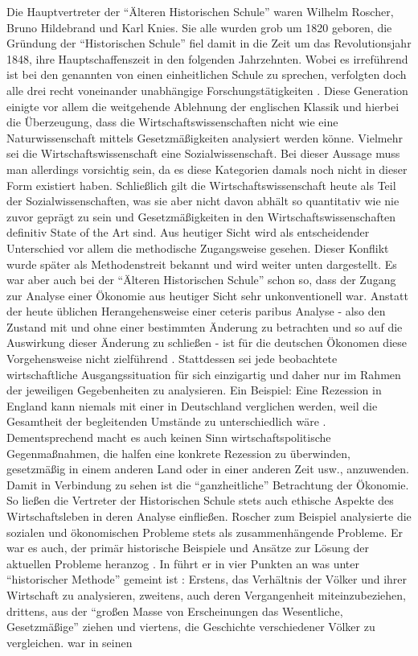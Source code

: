 Die Hauptvertreter der "`Älteren Historischen Schule"' waren Wilhelm Roscher, Bruno Hildebrand und Karl Knies. Sie alle wurden grob um 1820 geboren, die Gründung der "`Historischen Schule"' fiel damit in die Zeit um das Revolutionsjahr 1848, ihre Hauptschaffenszeit in den folgenden Jahrzehnten. Wobei es irreführend ist bei den genannten von einen einheitlichen Schule zu sprechen, verfolgten doch alle drei recht voneinander unabhängige Forschungstätigkeiten \parencite[S. 121]{Pierenkemper2012}. Diese Generation einigte vor allem die weitgehende Ablehnung der englischen Klassik und hierbei die Überzeugung, dass die Wirtschaftswissenschaften nicht wie eine Naturwissenschaft mittels Gesetzmäßigkeiten analysiert werden könne. Vielmehr sei die Wirtschaftswissenschaft eine Sozialwissenschaft. Bei dieser Aussage muss man allerdings vorsichtig sein, da es diese Kategorien damals noch nicht in dieser Form existiert haben. Schließlich gilt die Wirtschaftswissenschaft heute als Teil der Sozialwissenschaften, was sie aber nicht davon abhält so quantitativ wie nie zuvor geprägt zu sein und Gesetzmäßigkeiten in den Wirtschaftswissenschaften definitiv State of the Art sind. Aus heutiger Sicht wird als entscheidender Unterschied vor allem die methodische Zugangsweise gesehen. Dieser Konflikt wurde später als Methodenstreit bekannt und wird weiter unten dargestellt. Es war aber auch bei der "`Älteren Historischen Schule"' schon so, dass der Zugang zur Analyse einer Ökonomie aus heutiger Sicht sehr unkonventionell war. Anstatt der heute üblichen Herangehensweise einer ceteris paribus Analyse - also den Zustand mit und ohne einer bestimmten Änderung zu betrachten und so auf die Auswirkung dieser Änderung zu schließen - ist für die deutschen Ökonomen diese Vorgehensweise nicht zielführend \parencite[S. 236]{Rosner2012}. Stattdessen sei jede beobachtete wirtschaftliche Ausgangssituation für sich einzigartig und daher nur im Rahmen der jeweiligen Gegebenheiten zu analysieren. Ein Beispiel: Eine Rezession in England kann niemals mit einer in Deutschland verglichen werden, weil die Gesamtheit der begleitenden Umstände zu unterschiedlich wäre \parencite[S. 32]{Balabkins1993}. Dementsprechend macht es auch keinen Sinn wirtschaftspolitische Gegenmaßnahmen, die halfen eine konkrete Rezession zu überwinden, gesetzmäßig in einem anderen Land oder in einer anderen Zeit usw., anzuwenden. Damit in Verbindung zu sehen ist die "`ganzheitliche"' Betrachtung der Ökonomie. So ließen die Vertreter der Historischen Schule stets auch ethische Aspekte des Wirtschaftsleben in deren Analyse einfließen. Roscher zum Beispiel analysierte die sozialen und ökonomischen Probleme stets als zusammenhängende Probleme. Er war es auch, der primär historische Beispiele und Ansätze zur Lösung der aktuellen Probleme heranzog \parencite[S. 33]{Balabkins1993}. In \textcite{Roscher1843} führt er in vier Punkten an was unter "`historischer Methode"' gemeint ist \parencite[S. 123]{Pierenkemper2012}: Erstens, das Verhältnis der Völker und ihrer Wirtschaft zu analysieren, zweitens, auch deren Vergangenheit miteinzubeziehen, drittens, aus der "`großen Masse von Erscheinungen das Wesentliche, Gesetzmäßige"' ziehen und viertens, die Geschichte verschiedener Völker zu vergleichen. \textcite{Roscher1854, Roscher1843} war in seinen 